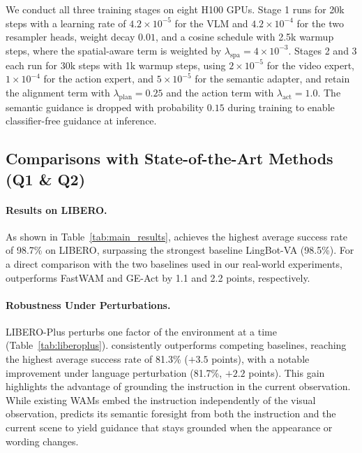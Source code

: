 We conduct all three training stages on eight H100 GPUs.
Stage 1 runs for 20k steps with a learning rate of $4.2{\times}10^{-5}$ for the VLM and $4.2{\times}10^{-4}$ for the two resampler heads, weight decay $0.01$, and a cosine schedule with 2.5k warmup steps, where the spatial-aware term is weighted by $\lambda_{\mathrm{spa}}{=}4{\times}10^{-3}$.
Stages 2 and 3 each run for 30k steps with 1k warmup steps, using $2{\times}10^{-5}$ for the video expert, $1{\times}10^{-4}$ for the action expert, and $5{\times}10^{-5}$ for the semantic adapter, and retain the alignment term with $\lambda_{\mathrm{plan}}{=}0.25$ and the action term with $\lambda_{\mathrm{act}}{=}1.0$.
The semantic guidance is dropped with probability $0.15$ during training to enable classifier-free guidance at inference.

\subsection{Comparisons with State-of-the-Art Methods (Q1 \& Q2)}
\label{sec:main_results}

\paragraph{Results on LIBERO.}
As shown in Table~\ref{tab:main_results}, \ourmethod achieves the highest average success rate of 98.7\% on LIBERO, surpassing the strongest baseline LingBot-VA (98.5\%).
For a direct comparison with the two baselines used in our real-world experiments, \ourmethod outperforms FastWAM and GE-Act by 1.1 and 2.2 points, respectively.

\paragraph{Robustness Under Perturbations.}
LIBERO-Plus perturbs one factor of the environment at a time (Table~\ref{tab:liberoplus}).
\ourmethod consistently outperforms competing baselines, reaching the highest average success rate of 81.3\% ($+3.5$ points), with a notable improvement under language perturbation (81.7\%, $+2.2$ points).
This gain highlights the advantage of grounding the instruction in the current observation.
While existing WAMs embed the instruction independently of the visual observation, \ourmethod predicts its semantic foresight from both the instruction and the current scene to yield guidance that stays grounded when the appearance or wording changes.

